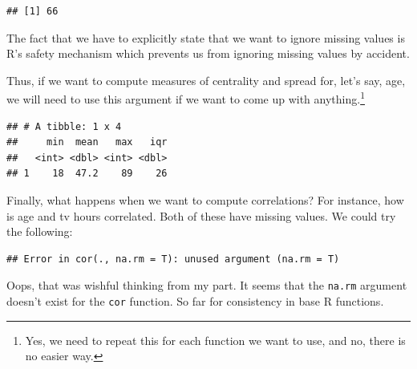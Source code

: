 \documentclass[]{tufte-book}
\newenvironment{Shaded}{}{}
\newcommand{\DataTypeTok}[1]{\textcolor[rgb]{0.56,0.13,0.00}{#1}}
\newcommand{\KeywordTok}[1]{\textcolor[rgb]{0.00,0.44,0.13}{\textbf{#1}}}
\newcommand{\NormalTok}[1]{#1}
\newcommand{\OperatorTok}[1]{\textcolor[rgb]{0.40,0.40,0.40}{#1}}
\newcommand{\StringTok}[1]{\textcolor[rgb]{0.25,0.44,0.63}{#1}}
\begin{document}
\begin{verbatim}
## [1] 66
\end{verbatim}

The fact that we have to explicitly state that we want to ignore missing values is R's safety mechanism which prevents us from ignoring missing values by accident.

Thus, if we want to compute measures of centrality and spread for, let's say, age, we will need to use this argument if we want to come up with anything.\footnote{Yes, we need to repeat this for each function we want to use, and no, there is no easier way.}

\begin{Shaded}
\end{Shaded}

\begin{verbatim}
## # A tibble: 1 x 4
##     min  mean   max   iqr
##   <int> <dbl> <int> <dbl>
## 1    18  47.2    89    26
\end{verbatim}

Finally, what happens when we want to compute correlations? For instance, how is age and tv hours correlated. Both of these have missing values. We could try the following:

\begin{Shaded}
\end{Shaded}

\begin{verbatim}
## Error in cor(., na.rm = T): unused argument (na.rm = T)
\end{verbatim}

Oops, that was wishful thinking from my part. It seems that the \texttt{na.rm} argument doesn't exist for the \texttt{cor} function. So far for consistency in base R functions.
\end{document}

